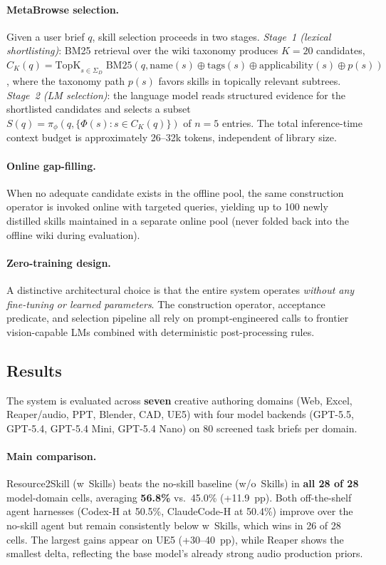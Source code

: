 \documentclass[11pt,a4paper]{article}
\begin{document}
\paragraph{MetaBrowse selection.}
Given a user brief $q$, skill selection proceeds in two stages. \emph{Stage~1 (lexical shortlisting)}: BM25 retrieval over the wiki taxonomy produces $K=20$ candidates, $C_K(q) = \text{TopK}_{s \in \Sigma_D}\;\text{BM25}(q, \text{name}(s) \oplus \text{tags}(s) \oplus \text{applicability}(s) \oplus p(s))$, where the taxonomy path $p(s)$ favors skills in topically relevant subtrees. \emph{Stage~2 (LM selection)}: the language model reads structured evidence for the shortlisted candidates and selects a subset $S(q) = \pi_\phi(q, \{\Phi(s) : s \in C_K(q)\})$ of $n=5$ entries. The total inference-time context budget is approximately 26--32k tokens, independent of library size.

\paragraph{Online gap-filling.}
When no adequate candidate exists in the offline pool, the same construction operator is invoked online with targeted queries, yielding up to 100 newly distilled skills maintained in a separate online pool (never folded back into the offline wiki during evaluation).

\paragraph{Zero-training design.}
A distinctive architectural choice is that the entire system operates \emph{without any fine-tuning or learned parameters}. The construction operator, acceptance predicate, and selection pipeline all rely on prompt-engineered calls to frontier vision-capable LMs combined with deterministic post-processing rules.

\subsection{Results}

The system is evaluated across \textbf{seven} creative authoring domains (Web, Excel, Reaper/audio, PPT, Blender, CAD, UE5) with four model backends (GPT-5.5, GPT-5.4, GPT-5.4 Mini, GPT-5.4 Nano) on 80 screened task briefs per domain.

\paragraph{Main comparison.}
Resource2Skill (w~Skills) beats the no-skill baseline (w/o~Skills) in \textbf{all 28 of 28} model-domain cells, averaging \textbf{56.8\%} vs.\ 45.0\% (+11.9~pp). Both off-the-shelf agent harnesses (Codex-H at 50.5\%, ClaudeCode-H at 50.4\%) improve over the no-skill agent but remain consistently below w~Skills, which wins in 26 of 28 cells. The largest gains appear on UE5 (+30--40~pp), while Reaper shows the smallest delta, reflecting the base model's already strong audio production priors.
\end{document}
